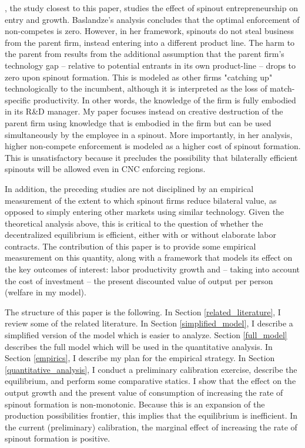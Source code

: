 \documentclass[12pt,english]{article}
\theoremstyle{remark}
\begin{document}
\cite{baslandze_spinout_2019}, the study closest to this paper, studies the effect of spinout entrepreneurship on entry and growth. Baslandze's analysis concludes that the optimal enforcement of non-competes is zero. However, in her framework, spinouts do not steal business from the parent firm, instead entering into a different product line. The harm to the parent from results from the additional assumption that the parent firm's technology gap -- relative to potential entrants in its own product-line -- drops to zero upon spinout formation. This is modeled as other firms "catching up" technologically to the incumbent, although it is interpreted as the loss of match-specific productivity. In other words, the knowledge of the firm is fully embodied in its R\&D manager. My paper focuses instead on creative destruction of the parent firm using knowledge that is embodied in the firm but can be used simultaneously by the employee in a spinout.  More importantly, in her analysis, higher non-compete enforcement is modeled as a higher cost of spinout formation. This is unsatisfactory because it precludes the possibility that bilaterally efficient spinouts will be allowed even in CNC enforcing regions. 

In addition, the preceding studies are not disciplined by an empirical measurement of the extent to which spinout firms reduce bilateral value, as opposed to simply entering other markets using similar technology. Given the theoretical analysis above, this is critical to the question of whether the decentralized equilibrium is efficient, either with or without elaborate labor contracts. The contribution of this paper is to provide some empirical measurement on this quantity, along with a framework that models its effect on the key outcomes of interest: labor productivity growth and -- taking into account the cost of investment -- the present discounted value of output per person (welfare in my model).

The structure of this paper is the following. In Section \ref{related_literature}, I review some of the related literature. In Section \ref{simplified_model}, I describe a simplified version of the model which is easier to analyze. Section \ref{full_model} describes the full model which will be used in the quantitative analysis. In Section \ref{empirics}, I describe my plan for the empirical strategy. In Section \ref{quantitative_analysis}, I conduct a preliminary calibration exercise, describe the equilibrium, and perform some comparative statics. I show that the effect on the output growth and the present value of consumption of increasing the rate of spinout formation is non-monotonic. Because this is an expansion of the production possibilities frontier, this implies that the equilibrium is inefficient. In the current (preliminary) calibration, the marginal effect of increasing the rate of spinout formation is positive. 
\end{document}
